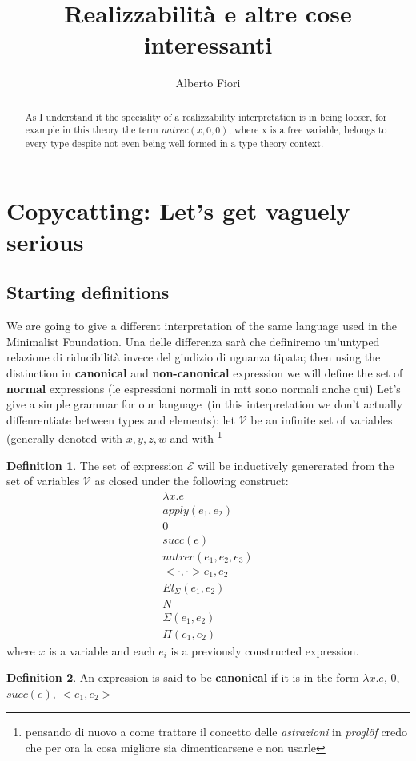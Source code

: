 \documentclass[11pt,a5paper,draft,oneside]{amsbook}
\author{Alberto Fiori}
\title{Realizzabilità e altre cose interessanti}
\theoremstyle{plain}%
\theoremstyle{definition}
\newtheorem{dede}{Definition}[section]
\theoremstyle{remark}
\newcommand{\Va}{\mathcal{V}}
\newcommand{\Ve}{\mathcal{E}}
\newcommand{\cp}[1][\cdot,\cdot]{<#1>}
\newcommand{\femph}{\textbf}
\begin{document}
\maketitle
\begin{abstract}
	As I understand it the speciality of a 
	realizzability 	interpretation is in 
	being looser, for example in this theory
	the term $natrec(x, 0, 0)$, where x is a free variable, belongs to every type despite not even being well formed in a type theory context. 
\end{abstract}

\section{Copycatting: Let's get vaguely serious}
	\subsection{Starting definitions}
		We are going to give a different interpretation 
		of the same language used in the Minimalist 
		Foundation. Una delle differenza sarà che definiremo
		un'untyped relazione di riducibilità invece 
		del giudizio di uguanza tipata; then using the distinction in \femph{canonical} and \femph{non-canonical} expression we will define the set of \femph{normal} expressions (le espressioni normali in mtt sono normali anche qui)
		Let's give a simple grammar for our language~(in this interpretation we don't actually diffenrentiate between types and elements): let $\Va$ be an infinite set of variables (generally denoted with $x,y,z,w$ and with \footnote{pensando di nuovo a come trattare il concetto delle \emph{astrazioni} in \textsl{proglöf} credo che per ora la cosa migliore sia dimenticarsene e non usarle}		
\begin{dede}
	The set of expression $\Ve$ will be inductively genererated from the set of variables $\Va$ as closed under the following construct:
	\begin{gather}
	 \lambda x.e \\
	 apply(e_1,e_2) \\
	 0 \\ 
	 succ(e) \\ 
	 natrec(e_1,e_2,e_3) \\ 
	 \cp{e_1,e_2} \\
	 El_\Sigma(e_1, e_2) \\
	 N 		\\
	 \Sigma(e_1,e_2)\\
	 \Pi(e_1,e_2)
	\end{gather}
	where $x$ is a variable and each $e_i$ is a previously constructed expression.
	\end{dede}
	\begin{dede}
		An expression is said to be \femph{canonical} if it is in the form $\lambda x.e$, 0, $succ(e)$, $\cp[e_1,e_2]$ 
	\end{dede}
	
\end{document}
